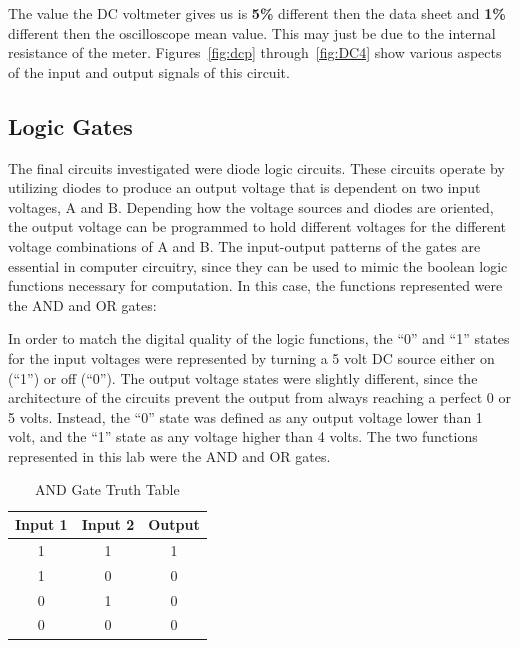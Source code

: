 \documentclass[twocolumn,english]{IEEEtran}
\begin{document}
The value the DC voltmeter gives us is \textbf{5\%} different then the data sheet and \textbf{1\%} different then the oscilloscope mean value. This may just be due to the internal resistance of the meter. Figures~\ref{fig:dcp} through~\ref{fig:DC4} show various aspects of the input and output signals of this circuit.

\noindent\hrulefill
\subsection{\textbf{Logic Gates}}
The final circuits investigated were diode logic circuits.
These circuits operate by utilizing diodes to produce an output voltage that is dependent on two input voltages, A and B.
Depending how the voltage sources and diodes are oriented, the output voltage can be programmed to hold different voltages for the different voltage combinations of A and B.
The input-output patterns of the gates are essential in computer circuitry, since they can be used to mimic the boolean logic functions necessary for computation.
In this case, the functions represented were the AND and OR gates:


In order to match the digital quality of the logic functions, the ``0'' and ``1'' states for the input voltages were represented by turning a 5 volt DC source either on (``1'') or off (``0'').
The output voltage states were slightly different, since the architecture of the circuits prevent the output from always reaching a perfect 0 or 5 volts.
Instead, the ``0'' state was defined as any output voltage lower than 1 volt, and the ``1'' state as any voltage higher than 4 volts.
The two functions represented in this lab were the AND and OR gates.


\begin{table}[H]
\centering{}
\caption{AND Gate Truth Table}
\begin{tabular}{@{}ccc@{}}
\toprule
\textbf{Input 1} & \multicolumn{1}{l}{\textbf{Input 2}} & \multicolumn{1}{l}{\textbf{Output}} \\ \midrule
1                & 1                                    & 1                                   \\
1                & 0                                    & 0                                   \\
0                & 1                                    & 0                                   \\
0                & 0                                    & 0                                   \\ \bottomrule
\end{tabular}
\end{table}
\end{document}
